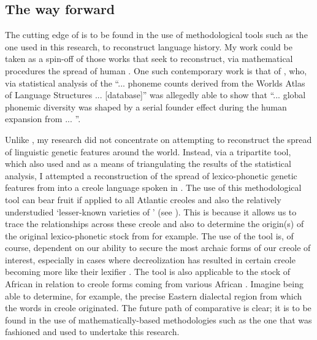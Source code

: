 \subsection{The way forward}\label{7.2.2}
The cutting edge of  is to be found in the use of methodological tools such as the one used in this research, to reconstruct language history. My work could be taken as a spin-off of those works that seek to reconstruct, via mathematical procedures the spread of human . One such contemporary work is that of \citet[348]{Atkinson11}, who, via statistical analysis of the ``... phoneme counts derived from the Worlds Atlas of Language Structures ... [database]'' was allegedly able to show that ``... global phonemic diversity was shaped by a serial founder effect during the human expansion from  ... ''.

Unlike \citet{Atkinson11}, my research did not concentrate on attempting to reconstruct the spread of linguistic genetic features around the world. Instead, via a tripartite tool, which also used  and  as a means of triangulating the results of the statistical analysis, I attempted a reconstruction of the spread of  lexico-phonetic genetic features from  into a creole language spoken in . The use of this methodological tool can bear fruit if applied to all Atlantic  creoles and also the relatively understudied `lesser-known varieties of ' (see \citealt{Aceto04, Williams03, Trudgill02}). This is because it allows us to trace the relationships across these creole  and also to determine the origin(s) of the original lexico-phonetic stock from  for example.
The use of the tool is, of course, dependent on our ability to secure the most archaic forms of our creole of interest, especially in cases where decreolization has resulted in certain  creole  becoming more like their lexifier . The tool is also applicable to the stock of African  in relation to creole forms coming from various African . Imagine being able to determine, for example, the precise Eastern  dialectal region from which the  words in   creole originated. The future path of comparative  is clear; it is to be found in the use of mathematically-based methodologies such as the one that was fashioned and used to undertake this research.
